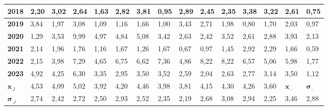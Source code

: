 \begin{tabular}{|l|l|l|l|l|l|l|l|l|l|l|l|l|l|l|}
    \textbf{2018} & 2,20 & 3,02 & 2,64 & 1,63 & 2,82 & 3,81 & 0,95 & 2,89 & 2,45 & 2,35 & 3,38 & 3,22 & 2,61 & 0,75 \\ \hline
    \textbf{2019} & 3,84 & 1,97 & 3,08 & 1,09 & 1,16 & 1,66 & 1,00 & 3,43 & 2,71 & 1,98 & 0,80 & 1,70 & 2,03 & 0,97 \\ \hline
    \textbf{2020} & 1,29 & 3,53 & 9,99 & 4,97 & 4,84 & 5,08 & 3,42 & 2,63 & 2,42 & 3,52 & 2,61 & 2,88 & 3,93 & 2,13 \\ \hline
    \textbf{2021} & 2,14 & 1,96 & 1,76 & 1,16 & 1,67 & 1,26 & 1,67 & 0,67 & 0,97 & 1,45 & 2,92 & 2,29 & 1,66 & 0,59 \\ \hline
    \textbf{2022} & 2,15 & 3,98 & 7,29 & 4,65 & 6,75 & 6,62 & 7,36 & 4,86 & 8,22 & 8,22 & 6,57 & 5,06 & 5,98 & 1,77 \\ \hline
    \textbf{2023} & 4,92 & 4,25 & 6,30 & 3,35 & 2,95 & 3,50 & 3,52 & 2,59 & 2,04 & 2,63 & 2,77 & 3,14 & 3,50 & 1,12 \\ \hline
    \textbf{$\bm{x}_{.j}$} & 4,53 & 4,09 & 5,02 & 3,92 & 4,20 & 4,46 & 3,98 & 3,81 & 4,15 & 4,30 & 4,26 & 3,60 & $\bm{x}_{..}$ & $\bm{\sigma}_{..}$ \\ \hline
    \textbf{$\bm{\sigma}_{.j}$} & 2,74 & 2,42 & 2,72 & 2,50 & 2,93 & 2,52 & 2,35 & 2,19 & 2,68 & 3,08 & 2,94 & 2,25 & 3,46 & 2,88 \\ \hline
\end{tabular}
